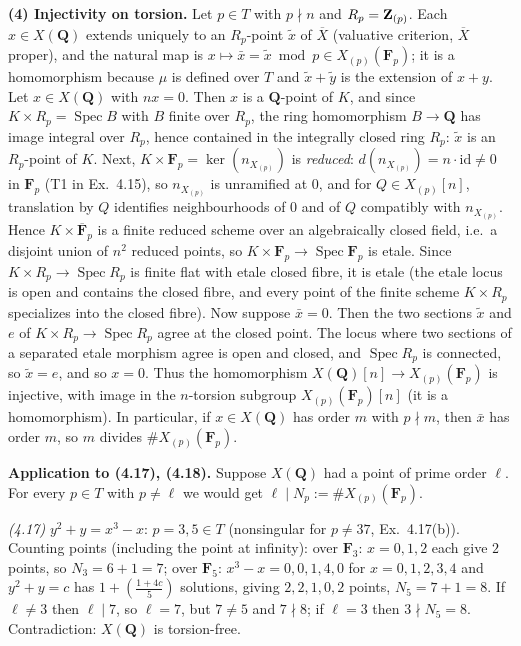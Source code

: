 \documentclass[11pt]{article}
\begin{document}
\textbf{(4) Injectivity on torsion.} Let $p\in T$ with $p\nmid n$ and $R_p=\mathbf Z_{(p)}$. Each $x\in X(\mathbf Q)$ extends uniquely to an $R_p$-point $\tilde x$ of $\overline X$ (valuative criterion, $\overline X$ proper), and the natural map is $x\mapsto\bar x=\tilde x\bmod p\in X_{(p)}(\mathbf F_p)$; it is a homomorphism because $\mu$ is defined over $T$ and $\tilde x+\tilde y$ is the extension of $x+y$. Let $x\in X(\mathbf Q)$ with $nx=0$. Then $x$ is a $\mathbf Q$-point of $K$, and since $K\times R_p=\operatorname{Spec}B$ with $B$ finite over $R_p$, the ring homomorphism $B\to\mathbf Q$ has image integral over $R_p$, hence contained in the integrally closed ring $R_p$: $\tilde x$ is an $R_p$-point of $K$. Next, $K\times\mathbf F_p=\ker(n_{X_{(p)}})$ is \emph{reduced}: $d(n_{X_{(p)}})=n\cdot\mathrm{id}\ne0$ in $\mathbf F_p$ (T1 in Ex.~4.15), so $n_{X_{(p)}}$ is unramified at $0$, and for $Q\in X_{(p)}[n]$, translation by $Q$ identifies neighbourhoods of $0$ and of $Q$ compatibly with $n_{X_{(p)}}$. Hence $K\times\overline{\mathbf F}_p$ is a finite reduced scheme over an algebraically closed field, i.e.\ a disjoint union of $n^2$ reduced points, so $K\times\mathbf F_p\to\operatorname{Spec}\mathbf F_p$ is etale. Since $K\times R_p\to\operatorname{Spec}R_p$ is finite flat with etale closed fibre, it is etale (the etale locus is open and contains the closed fibre, and every point of the finite scheme $K\times R_p$ specializes into the closed fibre). Now suppose $\bar x=0$. Then the two sections $\tilde x$ and $e$ of $K\times R_p\to\operatorname{Spec}R_p$ agree at the closed point. The locus where two sections of a separated etale morphism agree is open and closed, and $\operatorname{Spec}R_p$ is connected, so $\tilde x=e$, and so $x=0$. Thus the homomorphism $X(\mathbf Q)[n]\to X_{(p)}(\mathbf F_p)$ is injective, with image in the $n$-torsion subgroup $X_{(p)}(\mathbf F_p)[n]$ (it is a homomorphism). In particular, if $x\in X(\mathbf Q)$ has order $m$ with $p\nmid m$, then $\bar x$ has order $m$, so $m$ divides $\#X_{(p)}(\mathbf F_p)$.

\textbf{Application to (4.17), (4.18).} Suppose $X(\mathbf Q)$ had a point of prime order $\ell$. For every $p\in T$ with $p\ne\ell$ we would get $\ell\mid N_p:=\#X_{(p)}(\mathbf F_p)$.

\emph{(4.17)} $y^2+y=x^3-x$: $p=3,5\in T$ (nonsingular for $p\ne37$, Ex.~4.17(b)). Counting points (including the point at infinity): over $\mathbf F_3$: $x=0,1,2$ each give $2$ points, so $N_3=6+1=7$; over $\mathbf F_5$: $x^3-x=0,0,1,4,0$ for $x=0,1,2,3,4$ and $y^2+y=c$ has $1+\left(\frac{1+4c}{5}\right)$ solutions, giving $2,2,1,0,2$ points, $N_5=7+1=8$. If $\ell\ne3$ then $\ell\mid7$, so $\ell=7$, but $7\ne5$ and $7\nmid8$; if $\ell=3$ then $3\nmid N_5=8$. Contradiction: $X(\mathbf Q)$ is torsion-free.
\end{document}
